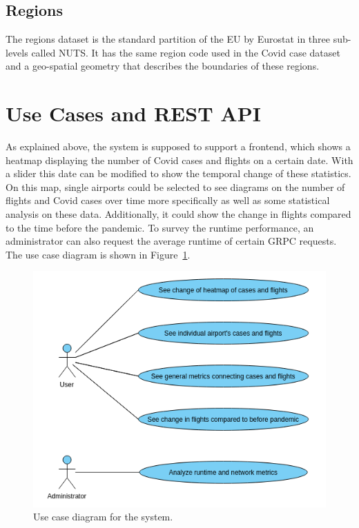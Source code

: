\documentclass[11pt]{article}
\begin{document}
	\subsection{Regions}
	
	The regions dataset is the standard partition of the EU by Eurostat in three sub-levels called NUTS. It has the same region code used in the Covid case dataset and a geo-spatial geometry that describes the boundaries of these regions.
	
	\section{Use Cases and REST API}
	
	As explained above, the system is supposed to support a frontend, which shows a heatmap displaying the number of Covid cases and flights on a certain date. With a slider this date can be modified to show the temporal change of these statistics. On this map, single airports could be selected to see diagrams on the number of flights and Covid cases over time more specifically as well as some statistical analysis on these data. Additionally, it could show the change in flights compared to the time before the pandemic. To survey the runtime performance, an administrator can also request the average runtime of certain GRPC requests. The use case diagram is shown in Figure~\ref{fig:use_cases}.
	
	\begin{figure}[h!]
		\centering
		\includegraphics[scale=0.6]{use_cases.png}
		\caption{Use case diagram for the system.}
		\label{fig:use_cases}
	\end{figure}
\end{document}

